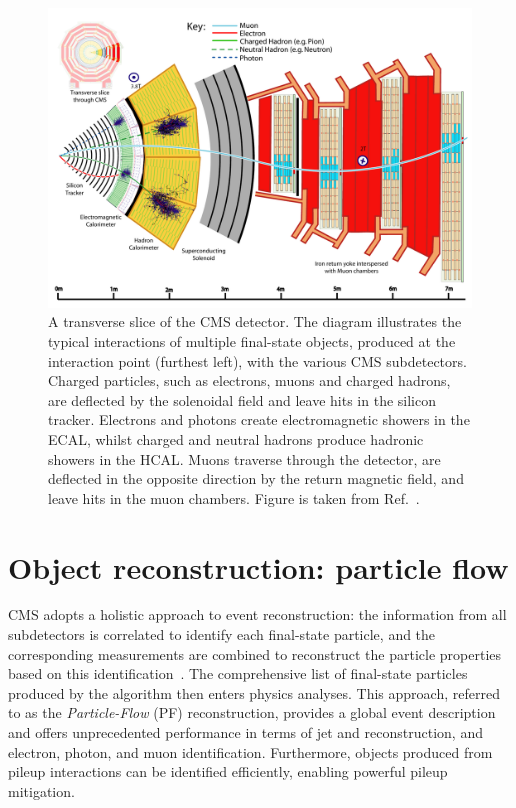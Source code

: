 \begin{figure}[t]
  \centering
  \includegraphics[width=1\textwidth]{Figures/cms/CMS-PRF-14-001_Figure_001.pdf}
  \caption[Particle interactions in the CMS detector]
  {
    A transverse slice of the CMS detector. The diagram illustrates the typical interactions of multiple final-state objects, produced at the interaction point (furthest left), with the various CMS subdetectors. Charged particles, such as electrons, muons and charged hadrons, are deflected by the solenoidal field and leave hits in the silicon tracker. Electrons and photons create electromagnetic showers in the ECAL, whilst charged and neutral hadrons produce hadronic showers in the HCAL. Muons traverse through the detector, are deflected in the opposite direction by the return magnetic field, and leave hits in the muon chambers. Figure is taken from Ref.~\cite{Sirunyan:2017ulk}.
  }
  \label{fig:cms_interactions}
\end{figure}

\section{Object reconstruction: particle flow}\label{sec:particle_flow}
CMS adopts a holistic approach to event reconstruction: the information from all subdetectors is correlated to identify each final-state particle, and the corresponding measurements are combined to reconstruct the particle properties based on this identification~\cite{Sirunyan:2017ulk}. The comprehensive list of final-state particles produced by the algorithm then enters physics analyses. This approach, referred to as the \textit{Particle-Flow} (PF) reconstruction, provides a global event description and offers unprecedented performance in terms of jet and \met reconstruction, and electron, photon, and muon identification. Furthermore, objects produced from pileup interactions can be identified efficiently, enabling powerful pileup mitigation.

